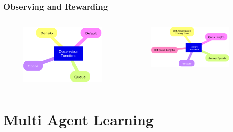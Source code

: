 \documentclass[dvipsnames]{beamer}
\begin{document}
\begin{frame}
\frametitle{Observing and Rewarding}
  \begin{columns}
  \begin{column}{0.4\textwidth}
    \begin{figure}
      \centering
      \includegraphics[width=1.0\textwidth]{figures/sumo-rf-observations.png}
    \end{figure}
  \end{column}
  \begin{column}{0.6\textwidth}
    \begin{figure}
      \centering
      \includegraphics[width=1.0\textwidth]{figures/sumo-rf-rewards.png}
    \end{figure}
  \end{column}
\end{columns}
\end{frame}

\section{Multi Agent Learning}
\end{document}
